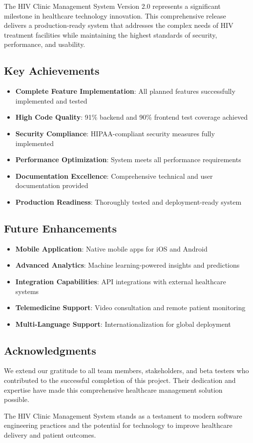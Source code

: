 \documentclass[12pt,a4paper]{article}
\begin{document}
The HIV Clinic Management System Version 2.0 represents a significant milestone in healthcare technology innovation. This comprehensive release delivers a production-ready system that addresses the complex needs of HIV treatment facilities while maintaining the highest standards of security, performance, and usability.

\subsection{Key Achievements}

\begin{itemize}
    \item \textbf{Complete Feature Implementation}: All planned features successfully implemented and tested
    \item \textbf{High Code Quality}: 91\% backend and 90\% frontend test coverage achieved
    \item \textbf{Security Compliance}: HIPAA-compliant security measures fully implemented
    \item \textbf{Performance Optimization}: System meets all performance requirements
    \item \textbf{Documentation Excellence}: Comprehensive technical and user documentation provided
    \item \textbf{Production Readiness}: Thoroughly tested and deployment-ready system
\end{itemize}

\subsection{Future Enhancements}

\begin{itemize}
    \item \textbf{Mobile Application}: Native mobile apps for iOS and Android
    \item \textbf{Advanced Analytics}: Machine learning-powered insights and predictions
    \item \textbf{Integration Capabilities}: API integrations with external healthcare systems
    \item \textbf{Telemedicine Support}: Video consultation and remote patient monitoring
    \item \textbf{Multi-Language Support}: Internationalization for global deployment
\end{itemize}

\subsection{Acknowledgments}

We extend our gratitude to all team members, stakeholders, and beta testers who contributed to the successful completion of this project. Their dedication and expertise have made this comprehensive healthcare management solution possible.

The HIV Clinic Management System stands as a testament to modern software engineering practices and the potential for technology to improve healthcare delivery and patient outcomes.
\end{document}
